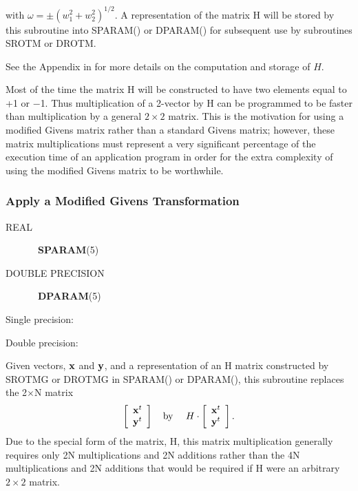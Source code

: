 \documentclass[twoside]{MATH77}
\begin{document}
with $\omega =\pm (w_1^2+w_2^2)^{1/2}$. A representation of the matrix H will be
stored by this subroutine into SPARAM() or DPARAM() for subsequent use by
subroutines SROTM or DROTM.

See the Appendix in \cite{Lawson:1979:BLA} for more details on the
computation and storage of $H.$

Most of the time the matrix H will be constructed to have two elements equal
to +1 or $-$1. Thus multiplication of a 2-vector by H can be programmed to
be faster than multiplication by a general $2\times 2$ matrix. This is the
motivation for using a modified Givens matrix rather than a standard Givens
matrix; however, these matrix multiplications must represent a very
significant percentage of the execution time of an application program in
order for the extra complexity of using the modified Givens matrix to be
worthwhile.

\subsubsection{Apply a Modified Givens Transformation\label{B7}}
\begin{description}
\item[REAL]  \ {\bf SPARAM}(5)

\item[DOUBLE PRECISION]  \ {\bf DPARAM}(5)
\end{description}
Single precision:

\begin{center}
\end{center}

Double precision:

\begin{center}
\end{center}

Given vectors, ${\bf x}$ and ${\bf y}$, and a representation of an H matrix
constructed by SROTMG or DROTMG in SPARAM() or DPARAM(), this subroutine
replaces the 2$\times $N matrix%
\begin{equation*}
\left[
\begin{array}{c}
{\bf x}^t \\ {\bf y}^t
\end{array}
\right] \quad \text{by }\quad H\cdot \left[
\begin{array}{c}
{\bf x}^t \\ {\bf y}^t
\end{array}
\right] .
\end{equation*}
Due to the special form of the matrix, H, this matrix multiplication
generally requires only 2N multiplications and 2N additions rather than the
4N multiplications and 2N additions that would be required if H were an
arbitrary $2\times 2$ matrix.
\end{document}
